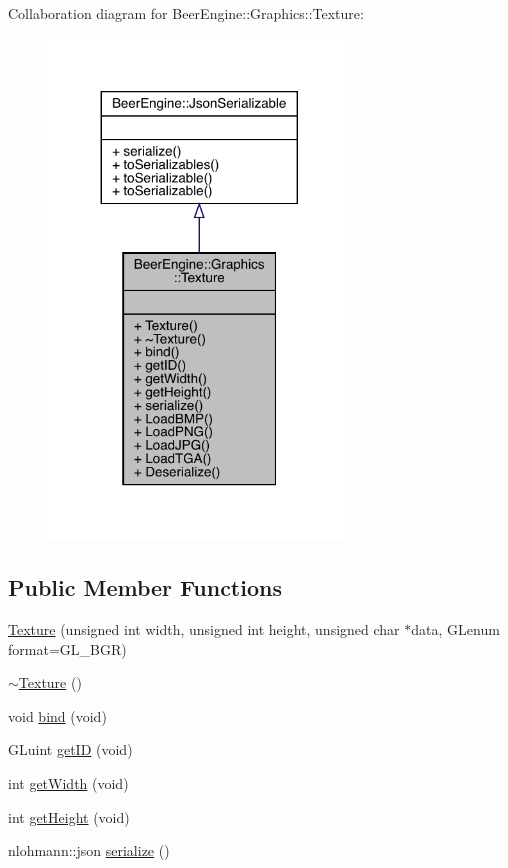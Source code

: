 Collaboration diagram for Beer\+Engine\+:\+:Graphics\+:\+:Texture\+:\nopagebreak
\begin{figure}[H]
\begin{center}
\leavevmode
\includegraphics[width=227pt]{class_beer_engine_1_1_graphics_1_1_texture__coll__graph}
\end{center}
\end{figure}
\subsection*{Public Member Functions}
\begin{DoxyCompactItemize}
\item 
\mbox{\hyperlink{class_beer_engine_1_1_graphics_1_1_texture_a1cb1dc8dea72805bec4fcbb150417c7f}{Texture}} (unsigned int width, unsigned int height, unsigned char $\ast$data, G\+Lenum format=G\+L\+\_\+\+B\+GR)
\item 
\mbox{\hyperlink{class_beer_engine_1_1_graphics_1_1_texture_aed43390619f1c87396b0155b5b093435}{$\sim$\+Texture}} ()
\item 
void \mbox{\hyperlink{class_beer_engine_1_1_graphics_1_1_texture_ae3d406ddddec85670df1e98d776353bf}{bind}} (void)
\item 
G\+Luint \mbox{\hyperlink{class_beer_engine_1_1_graphics_1_1_texture_abfa392e4a23ad309225526af572f9751}{get\+ID}} (void)
\item 
int \mbox{\hyperlink{class_beer_engine_1_1_graphics_1_1_texture_a1586064c91fdcf29b539a2fedd8f63ca}{get\+Width}} (void)
\item 
int \mbox{\hyperlink{class_beer_engine_1_1_graphics_1_1_texture_a961146ab713ba8fd18f8db95a97145ca}{get\+Height}} (void)
\item 
nlohmann\+::json \mbox{\hyperlink{class_beer_engine_1_1_graphics_1_1_texture_acb81c7ded6c7be42b0e901dd57dc8785}{serialize}} ()
\end{DoxyCompactItemize}
